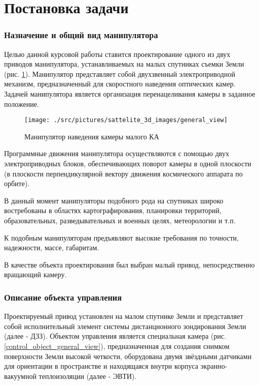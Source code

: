 \newpage
\part{Постановка задачи}
\section{Назначение и общий вид манипулятора}
Целью данной курсовой работы ставится проектирование одного из двух
приводов манипулятора, устанавливаемых на малых спутниках съемки Земли (рис. \ref{sattelite_general_view}).
Манипулятор представляет собой двухзвенный электроприводной механизм,
предназначенный для скоростного наведения оптических камер.
Задачей манипулятора является организация перенацеливания камеры в заданное положение.

\begin{figure}[h!]
    \centering
    \texttt{[image: ./src/pictures/sattelite\_3d\_images/general\_view]}
    \caption{Манипулятор наведения камеры малого КА}
    \label{sattelite_general_view}
\end{figure}

Программные движения манипулятора осуществляются с помощью двух электроприводных блоков,
обеспечивающих поворот камеры в одной плоскости (в плоскости перпендикулярной
вектору движения космического аппарата по орбите).

В данный момент манипуляторы подобного рода на спутниках широко востребованы
в областях картографирования, планировки территорий, образовательных,
разведывательных и военных целях, метеорологии и т.п.

К подобным манипуляторам предъявляют высокие требования по точности,
надежности, массе, габаритам.

В качестве объекта проектирования был выбран малый привод, непосредственно вращающий камеру.

\newpage
\section{Описание объекта управления}
Проектируемый привод установлен на малом спутнике Земли и представляет собой
исполнительный элемент системы дистанционного зондирования Земли (далее - ДЗЗ).
Объектом управления является специальная камера (рис. \ref{control_object_general_view}), предназначенная для создания
снимком поверхности Земли высокой четкости, оборудована двумя звёздными
датчиками для ориентации в пространстве и находящаяся внутри корпуса
экранно-вакуумной теплоизоляции (далее - ЭВТИ).

